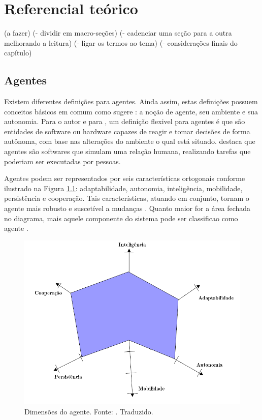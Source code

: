 \chapter[Referencial teórico]{Referencial teórico}\label{ch:referencial}

(a fazer)
(- dividir em macro-seções)
(- cadenciar uma seção para a outra melhorando a leitura)
(- ligar os termos ao tema)
(- considerações finais do capítulo)
\cite{serrano2011}
\cite{jennings2000}
\cite{zambonelli2001}

\section{Agentes}

Existem diferentes definições para agentes. Ainda assim, estas definições possuem conceitos básicos em comum como sugere : a noção de agente, seu ambiente e sua autonomia. Para o autor e para , um definição flexivel para agentes é que são entidades de software ou hardware capazes de reagir e tomar decisões de forma autônoma, com base nas alterações do ambiente o qual está situado.  destaca que agentes são softwares que simulam uma relação humana, realizando tarefas que poderiam ser executadas por pessoas.

Agentes podem ser representados por seis características ortogonais conforme ilustrado na Figura \ref{fig:hexagono}: adaptabilidade, autonomia, inteligência, mobilidade, persistência e cooperação. Tais características, atuando em conjunto, tornam o agente mais robusto e suscetível a mudanças \cite{griss2001software}. Quanto maior for a área fechada no diagrama, mais aquele componente do sistema pode ser classificao como agente \cite{griss2001software}.

\begin{figure}[h!]
    \includegraphics[scale=0.6]{figuras/hexagono_agente}
    \centering
    \caption{Dimensões do agente. Fonte: \cite{griss2001software}. Traduzido.}
    \label{fig:hexagono}
\end{figure}

